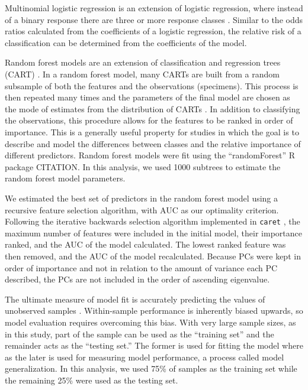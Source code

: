 \documentclass[12pt,letterpaper]{article}
\begin{document}
Multinomial logistic regression is an extension of logistic regression, where instead of a binary response there are three or more response classes \citep{Venables2002a}. Similar to the odds ratios calculated from the coefficients of a logistic regression, the relative risk of a classification can be determined from the coefficients of the model.

Random forest models are an extension of classification and regression trees (CART) \citep{Breiman1984,Breiman2001}. In a random forest model, many CARTs are built from a random subsample of both the features and the observations (specimens). This process is then repeated many times and the parameters of the final model are chosen as the mode of estimates from the distribution of CARTs \citep{Breiman2001}. In addition to classifying the observations, this procedure allows for the features to be ranked in order of importance. This is a generally useful property for studies in which the goal is to describe and model the differences between classes and the relative importance of different predictors. Random forest models were fit using the ``randomForest'' R package CITATION. In this analysis, we used 1000 subtrees to estimate the random forest model parameters. 

We estimated the best set of predictors in the random forest model using a recursive feature selection algorithm, with AUC as our optimality criterion. Following the iterative backwards selection algorithm implemented in \texttt{caret} \citep{KuhnMAN2013}, the maximum number of features were included in the initial model, their importance ranked, and the AUC of the model calculated. The lowest ranked feature was then removed, and the AUC of the model recalculated. Because PCs were kept in order of importance and not in relation to the amount of variance each PC described, the PCs are not included in the order of ascending eigenvalue.

The ultimate measure of model fit is accurately predicting the values of unobserved samples \citep{Hastie2009,Kuhn2013}. Within-sample performance is inherently biased upwards, so model evaluation requires overcoming this bias. With very large sample sizes, as in this study, part of the sample can be used as the ``training set'' and the remainder acts as the ``testing set.'' The former is used for fitting the model where as the later is used for measuring model performance, a process called model generalization. In this analysis, we used 75\% of samples as the training set while the remaining 25\% were used as the testing set.
\end{document}
